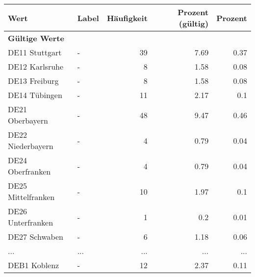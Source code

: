     \begin{longtable}{Xlrrr}
     \toprule
     \textbf{Wert} & \textbf{Label} & \textbf{Häufigkeit} & \textbf{Prozent (gültig)} & \textbf{Prozent} \\
     \endhead
     \midrule
     \multicolumn{5}{l}{\textbf{Gültige Werte}}\\
        \multicolumn{1}{X}{DE11 Stuttgart} & - & \num{39} & \num[round-mode=places,round-precision=2]{7.69} & \num[round-mode=places,round-precision=2]{0.37} \\
        \multicolumn{1}{X}{DE12 Karlsruhe} & - & \num{8} & \num[round-mode=places,round-precision=2]{1.58} & \num[round-mode=places,round-precision=2]{0.08} \\
        \multicolumn{1}{X}{DE13 Freiburg} & - & \num{8} & \num[round-mode=places,round-precision=2]{1.58} & \num[round-mode=places,round-precision=2]{0.08} \\
        \multicolumn{1}{X}{DE14 Tübingen} & - & \num{11} & \num[round-mode=places,round-precision=2]{2.17} & \num[round-mode=places,round-precision=2]{0.1} \\
        \multicolumn{1}{X}{DE21 Oberbayern} & - & \num{48} & \num[round-mode=places,round-precision=2]{9.47} & \num[round-mode=places,round-precision=2]{0.46} \\
        \multicolumn{1}{X}{DE22 Niederbayern} & - & \num{4} & \num[round-mode=places,round-precision=2]{0.79} & \num[round-mode=places,round-precision=2]{0.04} \\
        \multicolumn{1}{X}{DE24 Oberfranken} & - & \num{4} & \num[round-mode=places,round-precision=2]{0.79} & \num[round-mode=places,round-precision=2]{0.04} \\
        \multicolumn{1}{X}{DE25 Mittelfranken} & - & \num{10} & \num[round-mode=places,round-precision=2]{1.97} & \num[round-mode=places,round-precision=2]{0.1} \\
        \multicolumn{1}{X}{DE26 Unterfranken} & - & \num{1} & \num[round-mode=places,round-precision=2]{0.2} & \num[round-mode=places,round-precision=2]{0.01} \\
        \multicolumn{1}{X}{DE27 Schwaben} & - & \num{6} & \num[round-mode=places,round-precision=2]{1.18} & \num[round-mode=places,round-precision=2]{0.06} \\
       ... & ... & ... & ... & ... \\
        \multicolumn{1}{X}{DEB1 Koblenz} & - & \num{12} & \num[round-mode=places,round-precision=2]{2.37} & \num[round-mode=places,round-precision=2]{0.11} \\

\end{longtable}

